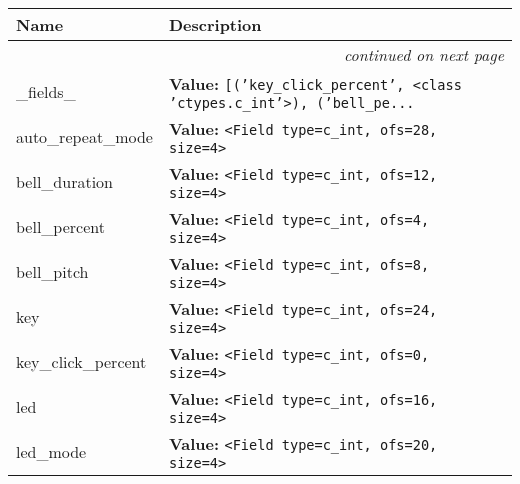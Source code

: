     \vspace{-1cm}
\hspace{\varindent}\begin{longtable}{|p{\varnamewidth}|p{\vardescrwidth}|l}
\cline{1-2}
\cline{1-2} \centering \textbf{Name} & \centering \textbf{Description}& \\
\cline{1-2}
\endhead\cline{1-2}\multicolumn{3}{r}{\small\textit{continued on next page}}\\\endfoot\cline{1-2}
\endlastfoot\raggedright \_\-f\-i\-e\-l\-d\-s\-\_\- & \raggedright \textbf{Value:} 
{\tt \texttt{[}\texttt{(}\texttt{'}\texttt{key\_click\_percent}\texttt{'}\texttt{, }{\textless}class 'ctypes.c\_int'{\textgreater}\texttt{)}\texttt{, }\texttt{(}\texttt{'}\texttt{bell\_pe}\texttt{...}}&\\
\cline{1-2}
\raggedright a\-u\-t\-o\-\_\-r\-e\-p\-e\-a\-t\-\_\-m\-o\-d\-e\- & \raggedright \textbf{Value:} 
{\tt {\textless}Field type=c\_int, ofs=28, size=4{\textgreater}}&\\
\cline{1-2}
\raggedright b\-e\-l\-l\-\_\-d\-u\-r\-a\-t\-i\-o\-n\- & \raggedright \textbf{Value:} 
{\tt {\textless}Field type=c\_int, ofs=12, size=4{\textgreater}}&\\
\cline{1-2}
\raggedright b\-e\-l\-l\-\_\-p\-e\-r\-c\-e\-n\-t\- & \raggedright \textbf{Value:} 
{\tt {\textless}Field type=c\_int, ofs=4, size=4{\textgreater}}&\\
\cline{1-2}
\raggedright b\-e\-l\-l\-\_\-p\-i\-t\-c\-h\- & \raggedright \textbf{Value:} 
{\tt {\textless}Field type=c\_int, ofs=8, size=4{\textgreater}}&\\
\cline{1-2}
\raggedright k\-e\-y\- & \raggedright \textbf{Value:} 
{\tt {\textless}Field type=c\_int, ofs=24, size=4{\textgreater}}&\\
\cline{1-2}
\raggedright k\-e\-y\-\_\-c\-l\-i\-c\-k\-\_\-p\-e\-r\-c\-e\-n\-t\- & \raggedright \textbf{Value:} 
{\tt {\textless}Field type=c\_int, ofs=0, size=4{\textgreater}}&\\
\cline{1-2}
\raggedright l\-e\-d\- & \raggedright \textbf{Value:} 
{\tt {\textless}Field type=c\_int, ofs=16, size=4{\textgreater}}&\\
\cline{1-2}
\raggedright l\-e\-d\-\_\-m\-o\-d\-e\- & \raggedright \textbf{Value:} 
{\tt {\textless}Field type=c\_int, ofs=20, size=4{\textgreater}}&\\
\cline{1-2}
\end{longtable}


